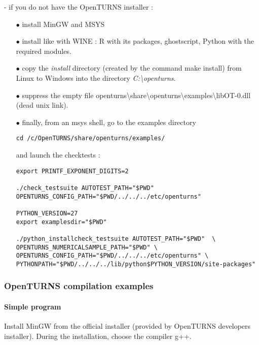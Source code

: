 - if you do not have the OpenTURNS installer :

\begin{itemize}
\item[$\bullet$]   install MinGW and MSYS
\item[$\bullet$]   install like with WINE : R with its packages, ghostscript, Python with the required modules.

\item[$\bullet$]   copy the \emph{install} directory (created by the command make install) from Linux to Windows into the directory \emph{C:\textbackslash openturns}.
\item[$\bullet$]   suppress the empty file openturns\textbackslash share\textbackslash openturns\textbackslash examples\textbackslash libOT-0.dll
(dead unix link).

\item[$\bullet$]   finally, from an msys shell, go to the examples directory

\begin{verbatim}
cd /c/OpenTURNS/share/openturns/examples/
\end{verbatim}

and launch the checktests :
\begin{verbatim}
export PRINTF_EXPONENT_DIGITS=2

./check_testsuite AUTOTEST_PATH="$PWD" OPENTURNS_CONFIG_PATH="$PWD/../../../etc/openturns"

PYTHON_VERSION=27
export examplesdir="$PWD"

./python_installcheck_testsuite AUTOTEST_PATH="$PWD"  \
OPENTURNS_NUMERICALSAMPLE_PATH="$PWD" \
OPENTURNS_CONFIG_PATH="$PWD/../../../etc/openturns" \
PYTHONPATH="$PWD/../../../lib/python$PYTHON_VERSION/site-packages"
\end{verbatim}
\end{itemize}


\subsubsection{OpenTURNS compilation examples}


\paragraph{Simple program\label{simple-program}}

Install MinGW from the official installer (provided by OpenTURNS developers installer). During the installation, choose the compiler g++.

